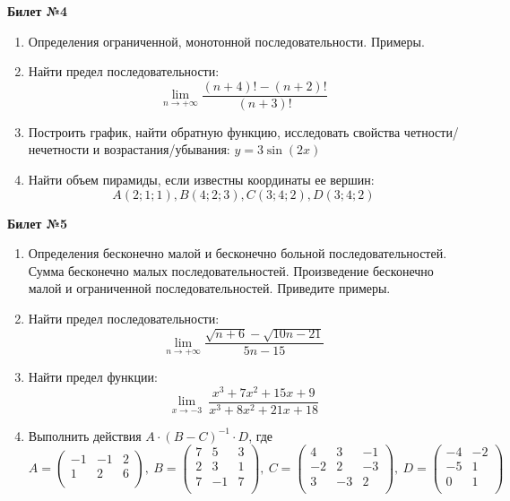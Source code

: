 \documentclass[a4paper, 12pt]{article}
\begin{document}
\newpage
\begin{center}
    \textbf{Билет №4}
\end{center}
\begin{enumerate}
\item Определения ограниченной, монотонной последовательности. Примеры.
\item Найти предел последовательности: \[\lim \limits_{n \to +\infty} \frac{(n+4)! - (n+2)!}{(n+3)!}\]
\item Построить график, найти обратную функцию, исследовать свойства четности/нечетности и возрастания/убывания:
$y = 3 \sin(2x)$
\item Найти объем пирамиды, если известны координаты ее вершин:
\[A(2;1;1), B(4;2;3), C(3;4;2), D(3;4;2)\]
\end{enumerate}

\begin{center}
    \textbf{Билет №5}
\end{center}
\begin{enumerate}
\item Определения бесконечно малой и бесконечно больной последовательностей. Сумма бесконечно малых последовательностей. Произведение бесконечно малой и ограниченной последовательностей. Приведите примеры.
\item Найти предел последовательности:  \[\lim \limits_{n \to +\infty} \frac{\sqrt{n+6} - \sqrt{10n - 21}}{5n - 15}\]
\item Найти предел функции: 
\[\lim \limits_{x \to -3}\ \frac{x^3 + 7x^2 + 15x + 9}{x^3 + 8x^2 + 21x + 18}\]
\item Выполнить действия \(A \cdot (B - C)^{-1}\cdot D\), где
\[
		A = \begin{pmatrix}
			-1 & -1 & 2 \\
			1 & 2 & 6 \\
		\end{pmatrix}, \ 
		B = \begin{pmatrix}
			7 & 5 & 3 \\
			2 & 3 & 1 \\
			7 & -1 & 7 \\
		\end{pmatrix}, \ 
		C = \begin{pmatrix}
			4 & 3 & -1 \\
			-2 & 2 & -3 \\
			3 & -3 & 2 \\
		\end{pmatrix}, \ 
		D = \begin{pmatrix}
			-4 & -2 \\
			-5 & 1 \\
			0 & 1 \\
		\end{pmatrix}
	\]
\end{enumerate}
\end{document}
